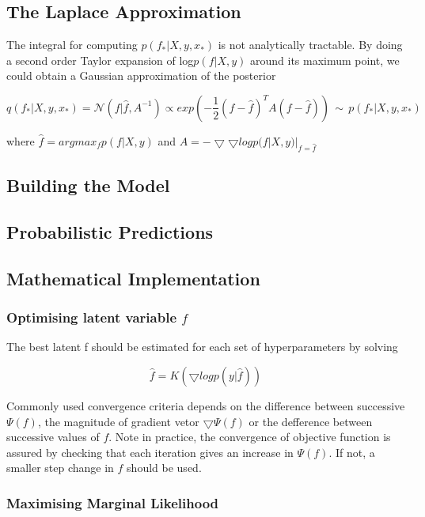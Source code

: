 \documentclass[11pt]{report}
\begin{document}
\begin{spacing}{2}
\subsection{The Laplace Approximation}

The integral for computing $p(f_*| X, y, x_*)$ is not analytically tractable. By doing a second order Taylor expansion of log$p(f|X,y)$ around its maximum point, we could obtain a Gaussian approximation of the posterior 

\begin{equation}\label{LaplaceApp}
q(f_*|X,y, x_*) = \mathcal{N}(f|\hat{f},A^{-1}) \propto exp(-\frac{1}{2}(f-\hat{f})^T A(f-\hat{f})) \,\sim\, p(f_*|X,y, x_*)
\end{equation}

where $\hat{f} = argmax_f p(f|X,y)$ and $A = -\bigtriangledown\bigtriangledown logp(f|X,y)|_{f=\hat{f}}$

\subsection{Building the Model}


\subsection{Probabilistic Predictions}



\subsection{Mathematical Implementation}
\space

\subsubsection{Optimising latent variable $f$}
The best latent f should be estimated for each set of hyperparameters by solving 

\[\hat{f} = K(\bigtriangledown logp(y|\hat{f}))\]

Commonly used convergence criteria depends on the difference between successive $\Psi (f)$, the magnitude of gradient vetor $\bigtriangledown\Psi (f)$ or the defference between successive values of $f$. Note in practice, the convergence of objective function is assured by checking that each iteration gives an increase in $\Psi (f)$. If not, a smaller step change in $f$ should be used.


\subsubsection{Maximising Marginal Likelihood}


\end{spacing}
\end{document}
